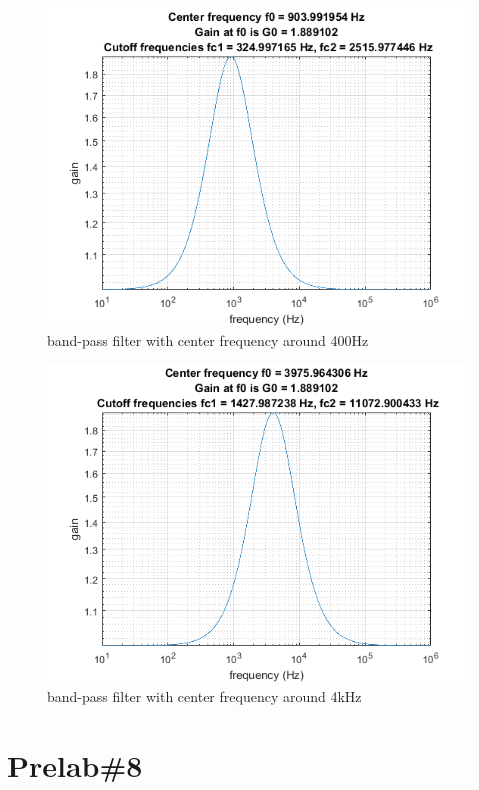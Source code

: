 \documentclass{IEEEtran}
\begin{document}
	\begin{figure}[!htbp]
		\centering
		\begin{framed}
			\includegraphics[width=\linewidth]{images/7_2.png}
			\caption{band-pass filter with center frequency around 400Hz}
			\label{fig:7.2}
		\end{framed}
	\end{figure}
	\begin{figure}[!htbp]
		\centering
		\begin{framed}
			\includegraphics[width=\linewidth]{images/7_3.png}
			\caption{band-pass filter with center frequency around 4kHz}
			\label{fig:7.3}
		\end{framed}
	\end{figure}
	\section{\textbf{Prelab\#8}}
	
\end{document}
